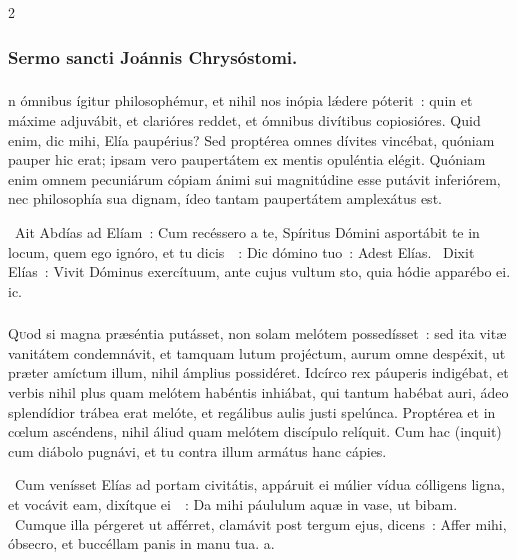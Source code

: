 \documentclass[9pt,twoside]{extarticle}
\begin{document}
\begin{multicols}{2}
{{\subsubsection*{\center Sermo sancti Joánnis Chrysóstomi.}
\subsubsection*{\center {}}
n ómnibus ígitur philosophémur, et nihil nos inópia lǽdere póterit~: quin et máxime adjuvábit, et clarióres reddet, et ómnibus divítibus copiosióres. Quid enim, dic mihi, Elía paupérius? Sed proptérea omnes dívites vincébat, quóniam pauper hic erat; ipsam vero paupertátem ex mentis opuléntia elégit. Quóniam enim omnem pecuniárum cópiam ánimi sui magnitúdine esse putávit inferiórem, nec philosophía sua dignam, ídeo tantam paupertátem amplexátus est.

\begin{tightlist}{}
\item {}~Ait Abdías ad Elíam~: Cum recéssero a te, Spíritus Dómini asportábit te in locum, quem ego ignóro, et tu dicis~~: \textred{*} Dic dómino tuo~: Adest Elías. ~Dixit Elías~: Vivit Dóminus exercítuum, ante cujus vultum sto, quia hódie apparébo ei. ic.
\end{tightlist}

\subsubsection*{\center {}}
\lettrine{Q}uod si magna præséntia putásset, non solam melótem possedísset~: sed ita vitæ vanitátem condemnávit, et tamquam lutum projéctum, aurum omne despéxit, ut præter amíctum illum, nihil ámplius possidéret. Idcírco rex páuperis indigébat, et verbis nihil plus quam melótem habéntis inhiábat, qui tantum habébat auri, ádeo splendídior trábea erat melóte, et regálibus aulis justi spelúnca. Proptérea et in cœlum ascéndens, nihil áliud quam melótem discípulo relíquit. Cum hac (inquit) cum diábolo pugnávi, et tu contra illum armátus hanc cápies.

\begin{tightlist}{}
\item {}~Cum venísset Elías ad portam civitátis, appáruit ei múlier vídua cólligens ligna, et vocávit eam, dixítque ei~~: \textred{*} Da mihi páululum aquæ in vase, ut bibam. ~Cumque illa pérgeret ut afférret, clamávit post tergum ejus, dicens~: Affer mihi, óbsecro, et buccéllam panis in manu tua. a.
\end{tightlist}

}}
\end{multicols}
\end{document}

